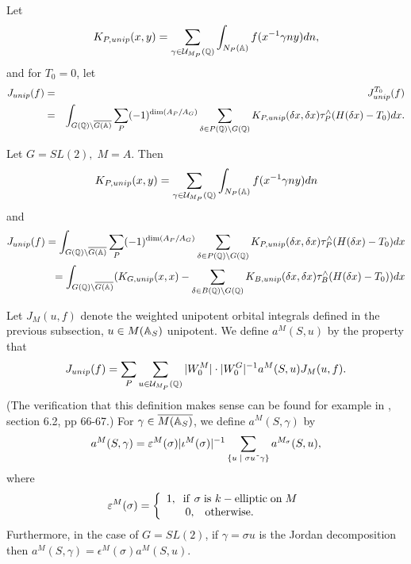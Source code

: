 \begin{definition}
Let 
\[
K_{P,unip}(x,y)
=\sum_{\gamma \in {\cal U}_{M_P}{\Bbb {(Q)}}}
\int_{N_P({\Bbb {A})}}f(x^{-1}\gamma ny)dn,
\]
and for $T_0=0$, let 
\begin{eqnarray*}
J_{unip}(f)
&=&J_{unip}^{T_0}(f) \\
&=&\int_{G({\Bbb{Q}})\backslash \overline{G({\Bbb{A}})}}
\sum_P(-1)^{\dim(A_P/A_G)}
\sum_{\delta \in P({\Bbb {Q}})\backslash G({\Bbb{Q}})}
K_{P,unip}(\delta x,\delta x)
\tau _P^{\wedge }(H(\delta x)-T_0)dx.
\end{eqnarray*}
\end{definition}

\begin{example}
Let $G=SL(2),\;M=A$. Then 
\[
K_{P,unip}(x,y)
=\sum_{\gamma \in {\cal U}_{M_P}({\Bbb {Q}})}
\int_{N_P({\Bbb {A})}}f(x^{-1}\gamma ny)dn
\]
and 
\begin{eqnarray*}
J_{unip}(f)
=\int_{G({\Bbb {Q}})\backslash \overline{G({\Bbb{A}})}}
\sum_P(-1)^{\dim(A_P/A_G)}
\sum_{\delta \in P({\Bbb {Q}})\backslash G({\Bbb{Q}})}
K_{P,unip}(\delta x,\delta x)
\tau _P^{\wedge }(H(\delta x)-T_0)dx \\
=\int_{G({\Bbb{Q}})\backslash \overline{G({\Bbb{A}})}}
(K_{G,unip}(x,x)-
\sum_{\delta \in B({\Bbb {Q}})\backslash G({\Bbb{Q}})}
K_{B,unip}(\delta x,\delta x)
\tau _B^{\wedge }(H(\delta x)-T_0))dx
\end{eqnarray*}
\end{example}

\begin{definition}
Let $J_M(u,f)$ denote the weighted unipotent orbital integrals defined in
the previous subsection,
$u\in M({\Bbb A}_S)$ unipotent.
We define $a^M(S,u)$ by the property that 
\[
J_{unip}(f)
=\sum_P
\sum_{u\in {\cal U}_{M_P}({\Bbb {Q}})}
|W_0^M|\cdot |W_0^G|^{-1}a^M(S,u)J_M(u,f).
\]
(The verification that this definition makes sense can be found
for example in \cite{Sho}, section 6.2, pp 66-67.) For
$\gamma\in \overline{M({\Bbb A}_S)}$, we define $a^M(S,\gamma )$ by 
\[
a^M(S,\gamma )
=\varepsilon ^M(\sigma )|\iota ^M(\sigma)|^{-1}
\sum_{\{u\;|\;\sigma u\symbol{126}\gamma \}}a^{M_\sigma }(S,u),
\]
where 
\[
\varepsilon ^M(\sigma )=\left\{ 
\begin{array}{c}
1,\;\;{\rm if}\ \sigma \;{\rm is\ }k-{\rm elliptic\;on}\;M \\ 
0,\;\;\;{\rm otherwise}.\;\;\;\;\;\;\;\;
\end{array}
\right. 
\]
Furthermore, in the case of $G=SL(2)$, if $\gamma =\sigma u$
is the Jordan decomposition then
$a^M(S,\gamma)=\epsilon^M(\sigma)a^M(S,u)$.
\end{definition}

